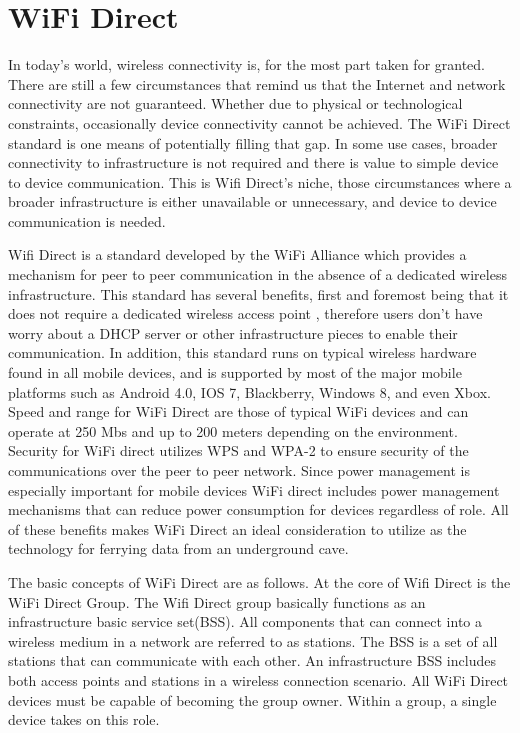 \documentclass[10pt,twocolumn]{article}
\begin{document}
\section{WiFi Direct}
In today's world, wireless connectivity is, for the most part taken for granted. 
There are still a few circumstances that remind us that the Internet and network connectivity are not guaranteed. 
Whether due to physical or technological constraints, occasionally device connectivity cannot be achieved. 
The WiFi Direct standard is one means of potentially filling that gap. 
In some use cases, broader connectivity to infrastructure is not required and there is value to simple device to device communication. 
This is Wifi Direct's niche, those circumstances where a broader infrastructure is either unavailable or unnecessary, and device to device communication is needed.

Wifi Direct is a standard developed by the WiFi Alliance which provides a mechanism for peer to peer communication in the absence of a dedicated wireless infrastructure. 
This standard has several benefits, first and foremost being that it does not require a dedicated wireless access point \cite{whywifid}
, therefore users don't have worry about a DHCP server or other infrastructure pieces to enable their communication. 
In addition, this standard runs on typical wireless hardware found in all mobile devices, and is supported by most of the major mobile platforms such as Android 4.0, IOS 7, Blackberry, Windows 8, and even Xbox. 
Speed and range for WiFi Direct are those of typical WiFi devices and can operate at 250 Mbs and up to 200 meters depending on the environment. 
Security for WiFi direct utilizes WPS and WPA-2 to ensure security of the communications over the peer to peer network. 
Since power management is especially important for mobile devices WiFi direct includes power management mechanisms that can reduce power consumption for devices regardless of role.
All of these benefits makes WiFi Direct an ideal consideration to utilize as the technology for ferrying data from an underground cave.

The basic concepts of WiFi Direct are as follows. 
At the core of Wifi Direct is the WiFi Direct Group. 
The Wifi Direct group basically functions as an infrastructure basic service set(BSS). 
All components that can connect into a wireless medium in a network are referred to as stations. 
The BSS is a set of all stations that can communicate with each other. 
An infrastructure BSS includes both access points and stations in a wireless connection scenario.\cite{wirelesslanwiki}
All WiFi Direct devices must be capable of becoming the group owner. 
Within a group, a single device takes on this role.
 
\end{document}
